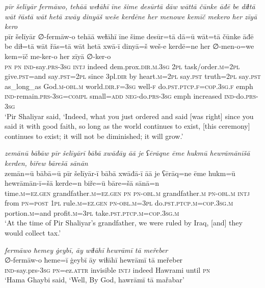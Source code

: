 \ea \label{ŽP.243}
\textit{pīr šelīyār fermāwo, tehāā weɫāhī īne šime desūrtā dāw wāttā čūnke āđē be diɫtā wāt řāstā wāt hetā xwāy dinyāš weše kerdēne her menowe kemīč mekero her zīyā kero} \\ 
\gll pīr šelīyār ∅-fermāw-o tehāā weɫāhī īne šime desūr=tā dā=ū wāt=tā čūnke āđē be diɫ=tā wāt řās=tā wāt hetā xwā-ī dinyā=š weš-e kerdē=ne her ∅-men-o=we kem=īč me-ker-o her zīyā ∅-ker-o \\ 
 \textsc{pn} \textsc{pn} \textsc{ind-}say\textsc{.prs}\textsc{-3sg} \textsc{intj} indeed dem.prox\textsc{.dir}\textsc{.m}\textsc{.3sg} \textsc{2pl} task/order\textsc{.m}=\textsc{2pl} give\textsc{.pst}=and say\textsc{.pst}=\textsc{2pl} since 3pl\textsc{.dir} by heart\textsc{.m}=\textsc{2pl} say\textsc{.pst} truth=\textsc{2pl} say\textsc{.pst} as\_long\_as God\textsc{.m}\textsc{-obl}\textsc{.m} world\textsc{.dir}\textsc{.f}\textsc{=3sg} well\textsc{-f} do\textsc{.pst}\textsc{.ptcp}\textsc{.f}\textsc{=cop}\textsc{.3sg}\textsc{.f} emph \textsc{ind-}remain\textsc{.prs}\textsc{-3sg}\textsc{=compl} small\textsc{=add} \textsc{neg-}do\textsc{.prs}\textsc{-3sg} emph increased \textsc{ind-}do\textsc{.prs}\textsc{-3sg} \\ 
\glt `Pir Shaliyar said, ‘Indeed, what you just ordered and said [was right] since you said it with good faith, so long as the world continues to exist, [this ceremony] continues to exist; it will not be diminished; it will grow.'
\z 
 
\ea \label{BP.11}
\textit{zemānū bābāw pīr šelīyārī bābā xwāđāy āā je ʕērāqne ēme hukmū hewrāmānīšā kerden, biřew bārešā sānān} \\ 
\gll zemān=ū bābā=ū pīr šelīyār-ī bābā xwāđā-ī āā je ʕērāq=ne ēme hukm=ū hewrāmān-ī=šā kerde=n biře=ū bāre=šā sānā=n \\ 
 time\textsc{.m}\textsc{=ez.gen} grandfather\textsc{.m}\textsc{=ez.gen} \textsc{pn} \textsc{pn}\textsc{-obl}\textsc{.m} grandfather\textsc{.m} \textsc{pn}\textsc{-obl}\textsc{.m} \textsc{intj} from \textsc{pn}\textsc{=\textsc{post}} \textsc{1pl} rule\textsc{.m}\textsc{=ez.gen} \textsc{pn}\textsc{-obl}\textsc{.m}\textsc{=3pl} do\textsc{.pst}\textsc{.ptcp}\textsc{.m}\textsc{=cop}\textsc{.3sg}\textsc{.m} portion\textsc{.m}=and profit\textsc{.m}\textsc{=3pl} take\textsc{.pst}\textsc{.ptcp}\textsc{.m}\textsc{=cop}\textsc{.3sg}\textsc{.m} \\ 
\glt `At the time of Pir Shaliyar’s grandfather, we were ruled by Iraq, [and] they would collect tax.'
\z 
 
\ea \label{BP.113}
\textit{fermāwo ħemey ġeybī, āy wiɫāhī hewrāmī tā meřeber} \\ 
\gll ∅-fermāw-o ħeme=ī ġeybī āy wiɫāhī hewrāmī tā meřeber \\ 
 \textsc{ind-}say.prs\textsc{-3sg} \textsc{pn}=ez.\textsc{attr} invisible \textsc{intj} indeed Hawrami until \textsc{pn} \\ 
\glt `Hama Ghaybi said, ‘Well, By God, hawrāmī tā mařabar'
\z 
 
